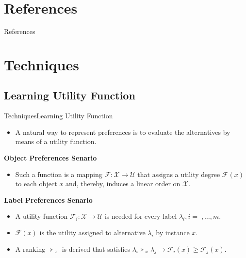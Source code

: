 \documentclass[]{beamer}
\newcommand{\Ytri}{$\triangleright$ }
\newcommand{\itemYtri}{\item[\Ytri]}
\renewcommand{\|}[1][.3em]{\hspace{#1}|\hspace{#1}}
\renewcommand{\,}[1][.3em]{,\hspace{#1}}
\begin{document}
\section{References}
\begin{frame}{References}
    \nocite{*}
    {\scriptsize
    
    
    }
\end{frame}

\appendix

\section{Techniques}
\frame{\tableofcontents[currentsection]}
\subsection{Learning Utility Function}
\begin{frame}{Techniques}{Learning Utility Function}
    \begin{itemize}
    \item A natural way to represent preferences is to evaluate the alternatives by means of a utility function.
    \end{itemize}
    \pause
    \begin{block}{\textbf{Object Preferences Senario}}
        \begin{itemize}[<+->]
        \itemYtri Such a function is a mapping $\mathcal{F} : \mathcal{X} \rightarrow \mathcal{U}$ that assigns a utility degree $\mathcal{F}(x)$ to each object $x$ and, thereby, induces a linear order on $\mathcal{X}$.
        \end{itemize}
    \end{block}
    \begin{block}{\textbf{Label Preferences Senario}}
        \begin{itemize}[<+->]
        \itemYtri A utility function $\mathcal{F}_i : \mathcal{X} \rightarrow \mathcal{U}$ is needed for every label $\lambda_i , i = ,\ldots,m$.
        \itemYtri $\mathcal{F}(x)$ is the utility assigned to alternative $\lambda_i$ by instance $x$.
        \itemYtri A ranking $\succ_x$ is derived that satisfies $\lambda_i \succ_x \lambda_j \rightarrow \mathcal{F}_i(x)\geq\mathcal{F}_j(x)$.
        \end{itemize}
    \end{block}
\end{frame}
\end{document}
